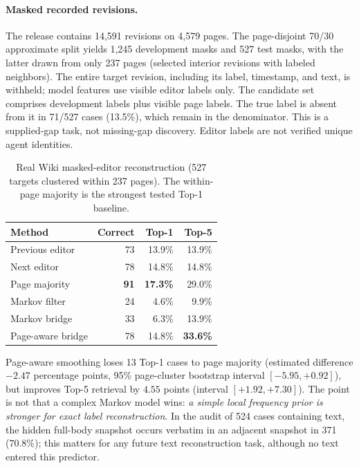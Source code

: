 \documentclass[10pt,twocolumn]{article}
\begin{document}
\paragraph{Masked recorded revisions.} The release contains 14,591 revisions on 4,579 pages. The page-disjoint 70/30 approximate split yields 1,245 development masks and 527 test masks, with the latter drawn from only 237 pages (selected interior revisions with labeled neighbors). The entire target revision, including its label, timestamp, and text, is withheld; model features use visible editor labels only. The candidate set comprises development labels plus visible page labels. The true label is absent from it in 71/527 cases (13.5\%), which remain in the denominator. This is a supplied-gap task, not missing-gap discovery. Editor labels are not verified unique agent identities.

\begin{table}[t]
\centering
\caption{Real Wiki masked-editor reconstruction (527 targets clustered within 237 pages). The within-page majority is the strongest tested Top-1 baseline.}
\label{tab:wiki_revision}
\setlength{\tabcolsep}{3.4pt}\footnotesize
\begin{tabular}{@{}lrrr@{}}\toprule
Method & Correct & Top-1 & Top-5\\\midrule
Previous editor & 73 & 13.9\% & 13.9\%\\
Next editor & 78 & 14.8\% & 14.8\%\\
Page majority & \textbf{91} & \textbf{17.3\%} & 29.0\%\\
Markov filter & 24 & 4.6\% & 9.9\%\\
Markov bridge & 33 & 6.3\% & 13.9\%\\
Page-aware bridge & 78 & 14.8\% & \textbf{33.6\%}\\\bottomrule
\end{tabular}
\end{table}

Page-aware smoothing loses 13 Top-1 cases to page majority (estimated difference $-2.47$ percentage points, 95\% page-cluster bootstrap interval $[-5.95,+0.92]$), but improves Top-5 retrieval by $4.55$ points (interval $[+1.92,+7.30]$). The point is not that a complex Markov model wins: \emph{a simple local frequency prior is stronger for exact label reconstruction}. In the audit of 524 cases containing text, the hidden full-body snapshot occurs verbatim in an adjacent snapshot in 371 (70.8\%); this matters for any future text reconstruction task, although no text entered this predictor.
\end{document}

